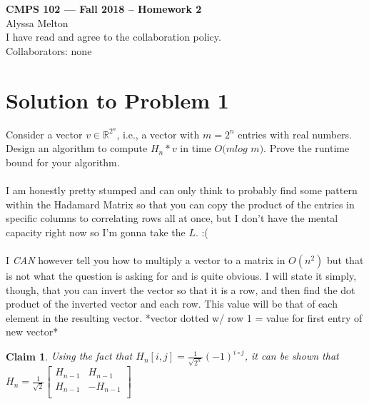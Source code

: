 \documentclass[11pt]{article}
\newtheorem{claim}[theorem]{Claim}
\begin{document}
	
	\begin{center}
		{\bf\Large CMPS 102 --- Fall 2018 --  Homework 2}\\
		Alyssa Melton\\
		I have read and agree to the collaboration policy. \\
		Collaborators: none\\
	\end{center}
	
	
	\section*{Solution to Problem 1}
		Consider a vector $v \in \mathbb{R}^{2^n}$, i.e., a vector with $m= 2^n$ entries with real numbers.
		Design an  algorithm to compute $H_n * v$ in  time $O(mlog$ $m)$.   Prove  the  runtime  bound  for  your algorithm.\\
		\\
		I am honestly pretty stumped and can only think to probably find some pattern within the Hadamard Matrix so that you can copy the product of the entries in specific columns to correlating rows all at once, but I don't have the mental capacity right now so I'm gonna take the $L$. :( \\
		\\
		I \textit{CAN} however tell you how to multiply a vector to a matrix in $O(n^2)$ but that is not what the question is asking for and is quite obvious. I will state it simply, though, that you can invert the vector so that it is a row, and then find the dot product of the inverted vector and each row. This value will be that of each element in the resulting vector. *vector dotted w/ row 1 = value for first entry of new vector*
		
		
		
	\begin{claim} 
		Using the fact that $H_n[i, j] = \frac{1}{\sqrt{2^n}}(−1)^{i \circ j}$, it can be shown that\\
		$H_n = \frac{1}{\sqrt{2}}\begin{bmatrix}
			H_{n-1} & H_{n-1} \\
			H_{n-1} & -H_{n-1} \\
		\end{bmatrix}
		$
	\end{claim}
	
\end{document}
